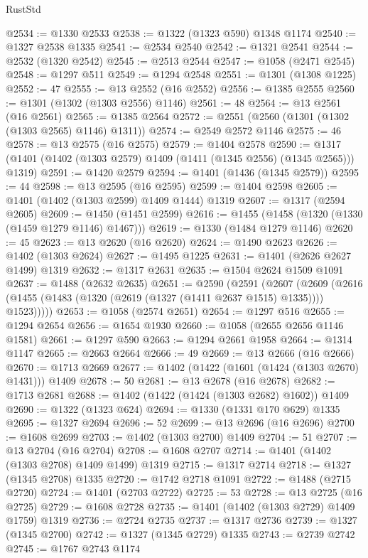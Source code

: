 \begin{lexlean}{RustStd}
\begin{coremodule}
@2534 := @1330 @2533
@2538 := @1322 (@1323 @590) @1348 @1174
@2540 := @1327 @2538 @1335
@2541 := @2534 @2540
@2542 := @1321 @2541
@2544 := @2532 (@1320 @2542)
@2545 := @2513 @2544
@2547 := @1058 (@2471 @2545)
@2548 := @1297 @511
@2549 := @1294 @2548
@2551 := @1301 (@1308 @1225)
@2552 := 47
@2555 := @13 @2552 (@16 @2552)
@2556 := @1385 @2555
@2560 := @1301 (@1302 (@1303 @2556) @1146)
@2561 := 48
@2564 := @13 @2561 (@16 @2561)
@2565 := @1385 @2564
@2572 := @2551 (@2560 (@1301 (@1302 (@1303 @2565) @1146) @1311))
@2574 := @2549 @2572 @1146
@2575 := 46
@2578 := @13 @2575 (@16 @2575)
@2579 := @1404 @2578
@2590 := @1317 (@1401 (@1402 (@1303 @2579) @1409 (@1411 (@1345 @2556) (@1345 @2565))) @1319)
@2591 := @1420 @2579
@2594 := @1401 (@1436 (@1345 @2579))
@2595 := 44
@2598 := @13 @2595 (@16 @2595)
@2599 := @1404 @2598
@2605 := @1401 (@1402 (@1303 @2599) @1409 @1444) @1319
@2607 := @1317 (@2594 @2605)
@2609 := @1450 (@1451 @2599)
@2616 := @1455 (@1458 (@1320 (@1330 (@1459 @1279 @1146) @1467)))
@2619 := @1330 (@1484 @1279 @1146)
@2620 := 45
@2623 := @13 @2620 (@16 @2620)
@2624 := @1490 @2623
@2626 := @1402 (@1303 @2624)
@2627 := @1495 @1225
@2631 := @1401 (@2626 @2627 @1499) @1319
@2632 := @1317 @2631
@2635 := @1504 @2624 @1509 @1091
@2637 := @1488 (@2632 @2635)
@2651 := @2590
    (@2591
      (@2607
        (@2609 (@2616 (@1455 (@1483 (@1320 (@2619 (@1327 (@1411 @2637 @1515) @1335)))) @1523)))))
@2653 := @1058 (@2574 @2651)
@2654 := @1297 @516
@2655 := @1294 @2654
@2656 := @1654 @1930
@2660 := @1058 (@2655 @2656 @1146 @1581)
@2661 := @1297 @590
@2663 := @1294 @2661 @1958
@2664 := @1314 @1147
@2665 := @2663 @2664
@2666 := 49
@2669 := @13 @2666 (@16 @2666)
@2670 := @1713 @2669
@2677 := @1402 (@1422 (@1601 (@1424 (@1303 @2670) @1431))) @1409
@2678 := 50
@2681 := @13 @2678 (@16 @2678)
@2682 := @1713 @2681
@2688 := @1402 (@1422 (@1424 (@1303 @2682) @1602)) @1409
@2690 := @1322 (@1323 @624)
@2694 := @1330 (@1331 @170 @629) @1335
@2695 := @1327 @2694
@2696 := 52
@2699 := @13 @2696 (@16 @2696)
@2700 := @1608 @2699
@2703 := @1402 (@1303 @2700) @1409
@2704 := 51
@2707 := @13 @2704 (@16 @2704)
@2708 := @1608 @2707
@2714 := @1401 (@1402 (@1303 @2708) @1409 @1499) @1319
@2715 := @1317 @2714
@2718 := @1327 (@1345 @2708) @1335
@2720 := @1742 @2718 @1091
@2722 := @1488 (@2715 @2720)
@2724 := @1401 (@2703 @2722)
@2725 := 53
@2728 := @13 @2725 (@16 @2725)
@2729 := @1608 @2728
@2735 := @1401 (@1402 (@1303 @2729) @1409 @1759) @1319
@2736 := @2724 @2735
@2737 := @1317 @2736
@2739 := @1327 (@1345 @2700)
@2742 := @1327 (@1345 @2729) @1335
@2743 := @2739 @2742
@2745 := @1767 @2743 @1174

\end{coremodule}
\end{lexlean}
